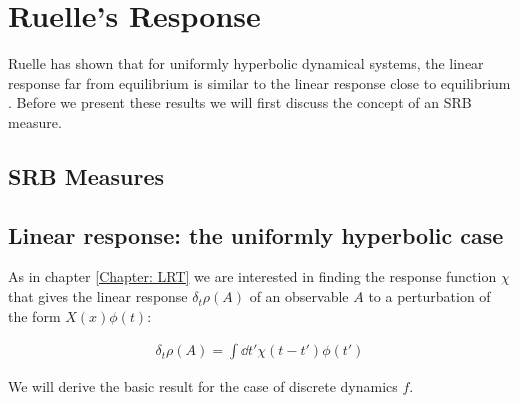 \section{Ruelle's Response}
Ruelle has shown that for uniformly hyperbolic dynamical systems, the linear response far from equilibrium is similar to the linear response close to equilibrium \cite{Ruelle}. Before we present these results we will first discuss the concept of an SRB measure.
\subsection{SRB Measures}

\subsection{Linear response: the uniformly hyperbolic case}

As in chapter \ref{Chapter: LRT} we are interested in finding the response function $\chi$ that gives the linear response $\delta_t\rho (A)$ of an observable $A$ to a perturbation of the form $X(x)\phi(t)$:

\begin{align}
\delta_t \rho(A) = \int \dd t' \chi(t - t') \phi (t')
\end{align}

\noindent We will derive the basic result for the case of discrete dynamics $f$.

